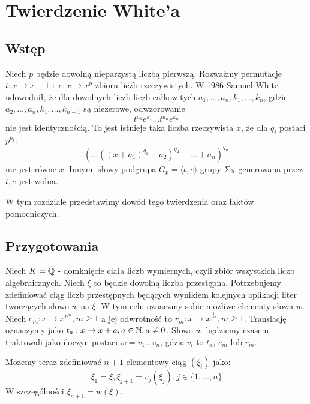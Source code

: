 \chapter{Twierdzenie White'a}
\label{ch:white_theorem}
\section{Wstęp}

Niech $p$ będzie dowolną nieparzystą liczbą pierwszą. Rozważmy permutacje 
${t : x \rightarrow  x+1}$ i~${e: x \rightarrow x^p}$ zbioru liczb
rzeczywistych. W 1986 Samuel White \cite{whi88} udowodnił, że dla dowolnych
liczb liczb całkowitych
$a_1, \ldots, a_n, k_1, \ldots, k_n$, gdzie $a_2, \ldots, a_n, k_1, \ldots,
k_{n-1}$ są niezerowe, odwzorowanie
\begin{equation*}
  t^{a_1}e^{k_1}\ldots t^{a_n}e^{k_n}
\end{equation*}
nie jest identycznością. To jest istnieje taka liczba rzeczywista $x$, że dla
$q_i$ postaci $p^{k_i}$:
\begin{equation*}
  \left( \ldots \left(\left(x + a_1\right)^{q_1} + a_2\right)^{q_2} +
    \ldots + a_n\right)^{q_n}
\end{equation*}
nie jest równe $x$. Innymi słowy podgrupa $G_p = \langle t, e \rangle$ grupy
$\Sigma_{\mathbb{R}}$ generowana przez $t, e$ jest wolna.

W tym rozdziale przedstawimy dowód tego twierdzenia oraz faktów pomocniczych.

\section{Przygotowania}
\label{sec:preparation}
Niech $K = \overline{\mathbb{Q}}$ - domknięcie ciała liczb wymiernych, czyli zbiór
wszystkich liczb algebraicznych.
Niech $\xi$ to będzie dowolną liczba przestępna.
Potrzebujemy zdefiniować ciąg liczb przestępnych będących wynikiem kolejnych
aplikacji liter tworzących słowo $w$ na $\xi$.
W tym celu oznaczmy sobie możliwe elementy słowa $w$.
Niech $e_m: x \rightarrow x^{p^m}, m \geq 1$ a jej odwrotność to $r_m: x
\rightarrow x^{\frac{1}{p^m}}, m \geq 1$.
Translację oznaczymy jako $t_a: x \rightarrow x + a, a \in \mathbb{N}, a \neq 0$.
Słowo $w$~będziemy czasem traktowali jako iloczyn postaci $w =
v_1\ldots v_n$, gdzie $v_i$ to $t_a$, $e_m$ lub $r_m$.

Możemy teraz zdefiniować $n+1$-elementowy ciąg $\left(\xi_i\right)$ jako:
\[\xi_1 = \xi, \xi_{j+1} = v_j\left(\xi_j\right), j \in \{1, \ldots, n\}\]
W szczególności $\xi_{n+1} = w(\xi)$.

